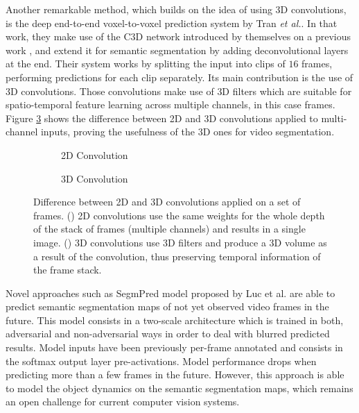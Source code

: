 Another remarkable method, which builds on the idea of using 3D convolutions, is the deep end-to-end voxel-to-voxel prediction system by Tran \emph{et al.}\cite{Tran2016}. In that work, they make use of the \ac{C3D} network introduced by themselves on a previous work \cite{Tran2015}, and extend it for semantic segmentation by adding deconvolutional layers at the end. Their system works by splitting the input into clips of $16$ frames, performing predictions for each clip separately. Its main contribution is the use of 3D convolutions. Those convolutions make use of \acl{3D} filters which are suitable for spatio-temporal feature learning across multiple channels, in this case frames. Figure \ref{fig:2dvs3dconvolutions} shows the difference between 2D and 3D convolutions applied to multi-channel inputs, proving the usefulness of the 3D ones for video segmentation.

\begin{figure}[!hbt]
	\centering
	\begin{subfigure}{0.49\linewidth}
		\caption{2D Convolution}
		\label{fig:2dvs3dconvolutions:2dconvolution}
	\end{subfigure}
	\hfill
	\begin{subfigure}{0.49\linewidth}
		\caption{3D Convolution}
		\label{fig:2dvs3dconvolutions:3dconvolution}
	\end{subfigure}
	\caption{Difference between 2D and 3D convolutions applied on a set of frames. (\protect{}) 2D convolutions use the same weights for the whole depth of the stack of frames (multiple channels) and results in a single image. (\protect{}) 3D convolutions use 3D filters and produce a 3D volume as a result of the convolution, thus preserving temporal information of the frame stack.}
	\label{fig:2dvs3dconvolutions}
\end{figure}

Novel approaches such as SegmPred model proposed by Luc et al. \cite{Luc2017} are able to predict semantic segmentation maps of not yet observed video frames in the future. This model consists in a two-scale architecture which is trained in both, adversarial and non-adversarial ways in order to deal with blurred predicted results. Model inputs have been previously per-frame annotated and consists in the softmax output layer pre-activations. Model performance drops when predicting more than a few frames in the future. However, this approach is able to model the object dynamics on the semantic segmentation maps, which remains an open challenge for current computer vision systems.

